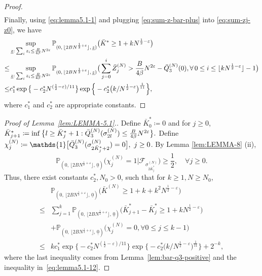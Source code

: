 \documentclass[11pt, reqno]{article}
\numberwithin{equation}{section}
\numberwithin{theorem}{section}
\begin{document}
\begin{appendix}
\begin{proof}
\begin{multline}
\end{multline}
Finally, using \eqref{eq:lemma5.1-1} and plugging \eqref{eq:sum-z-bar-plus} into \eqref{eq:sum-zj-z0}, we have 
\begin{align*}
    &\sup_{\underline{z}: \, \sum_iz_i \leq \frac{B}{4\beta}N^{2\varepsilon}}\mathbb{P}_{(0, \, \lfloor 2BN^{\frac{1}{2}+\varepsilon} \rfloor, \,\underline{z})}\big(\Bar{K}^{*}\geq 1+kN^{\frac{1}{2}-\varepsilon}\big)\nonumber\\
    \leq &  \sup_{\underline{z}: \, \sum_iz_i \leq \frac{B}{4\beta}N^{2\varepsilon}}\mathbb{P}_{(0, \, \lfloor 2BN^{\frac{1}{2}+\varepsilon} \rfloor, \,\underline{z})}\big(\sum_{j=0}^{i}\Bar{Z}^{(N)}_j>\frac{B}{4\beta}N^{2\varepsilon}-\bar{Q}^{(N)}_3(0),\forall \, 0\leq i\leq \lfloor kN^{\frac{1}{2}-\varepsilon}\rfloor -1\big)\\
    \leq & c^*_1\exp \big\{-c^*_2N^{(\frac{1}{2}-\varepsilon)/11}\big\}\exp \Big\{-c^*_2\big(k/N^{\frac{1}{2}-\varepsilon}\big)^{\frac{1}{11}}\Big\},
\end{align*}
where $c^*_1$ and $c^*_2$ are appropriate constants.
\end{proof}
\bigskip
\begin{proof}[Proof of Lemma~\ref{lem:LEMMA-5.1}.]
Define $\bar{K}^{*}_0\coloneqq0$ and for $j\geq 0$,
$
    \bar{K}^{*}_{j+1}\coloneqq \inf \big\{l\geq \bar{K}^{*}_{j}+1:\Bar{Q}^{(N)}_3(\sigma^{(N)}_{2l})\leq \frac{B}{4\beta}N^{2\varepsilon}\big\}.
$
Define $\chi^{(N)}_j\coloneqq  \mathds{1}\big[\Bar{Q}^{(N)}_3(\sigma^{(N)}_{2\bar{K}_j^{*}+2})=0\big],\ j\geq 0$.
By Lemma \ref{lem:LEMMA-8} (ii), \begin{equation}\label{eq:lemma5.1-12}
    \mathbb{P}_{(0, \, \lfloor 2BN^{\frac{1}{2}+\varepsilon} \rfloor, \,\underline{0})}\big(\chi^{(N)}_j=1|\mathcal{F}_{\sigma^{(N)}_{2\bar{K}^{*}_j}}\big)\geq \frac{1}{2},\quad \forall j\geq 0.
\end{equation}
Thus, there exist constants $c_2^*, N_0>0$, such that for $k\geq 1, N\geq N_0$,
\begin{align*}
    &\mathbb{P}_{(0, \, \lfloor 2BN^{\frac{1}{2}+\varepsilon} \rfloor, \,\underline{0})}\big(\bar{K}^{(N)}\geq 1+k+k^2N^{\frac{1}{2}-\varepsilon}\big)\\
    \leq & \sum_{j=1}^k\mathbb{P}_{(0, \, \lfloor 2BN^{\frac{1}{2}+\varepsilon} \rfloor, \,\underline{0})}\big(\bar{K}^{*}_{j+1}-\bar{K}^{*}_j\geq 1+kN^{\frac{1}{2}-\varepsilon}\big)\\
    &+\mathbb{P}_{(0, \, \lfloor 2BN^{\frac{1}{2}+\varepsilon} \rfloor, \,\underline{0})}\big(\chi^{(N)}_j=0, \forall 0\leq j\leq k-1\big)\\
    \leq & k c^*_1\exp \big\{-c^*_2N^{(\frac{1}{2}-\varepsilon)/11}\big\}\exp \Big\{-c^*_2\big(k/N^{\frac{1}{2}-\varepsilon}\big)^{\frac{1}{11}}\Big\}+2^{-k},
\end{align*}
where the last inequality comes from Lemma~\ref{lem:bar-q3-positive} and the inequality in~\eqref{eq:lemma5.1-12}.
\end{proof}







\end{appendix}
\end{document}
